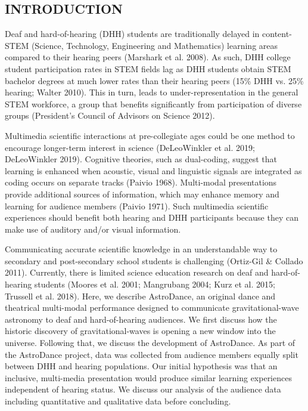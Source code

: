 \documentclass[11.5pt]{sig-alternate} %
\begin{document}
\begin{large}
  
\section*{INTRODUCTION}

Deaf and hard-of-hearing (DHH) students are traditionally delayed in content-STEM (Science, Technology, Engineering and Mathematics) learning areas compared to their hearing peers (Marshark et al. 2008).  As such, DHH college student participation rates in STEM fields lag as DHH students obtain STEM bachelor degrees at much lower rates than their hearing peers (15\% DHH vs. 25\% hearing; Walter 2010).  This in turn, leads to under-representation in the general STEM workforce, a group that benefits significantly from participation of diverse groups (President’s Council of Advisors on Science 2012).

Multimedia scientific interactions at pre-colle\-giate ages could be one method to encourage longer-term interest in science (DeLeoWinkler et al. 2019; DeLeoWinkler 2019).  Cognitive theories, such as dual-coding, suggest that learning is enhanced when acoustic, visual and linguistic signals are integrated as coding occurs on separate tracks (Paivio 1968).  Multi-modal presentations provide additional sources of information, which may enhance memory and learning for audience members (Paivio 1971).  Such multimedia scientific experiences should benefit both hearing and DHH participants because they can make use of auditory and/or visual information.

Communicating accurate scientific knowledge in an understandable way to secondary and post-secondary school students is challenging (Ortiz-Gil \& Collado 2011).  Currently, there is limited science education research on deaf and hard-of-hearing students (Moores et al. 2001; Mangrubang 2004; Kurz et al. 2015; Trussell et al. 2018).  Here, we describe AstroDance, an original dance and theatrical multi-modal performance designed to communicate gravitational-wave astronomy to deaf and hard-of-hearing audiences.  We first discuss how the historic discovery of gravitational-waves is opening a new window into the universe.  Following that, we discuss the development of AstroDance.  As part of the AstroDance project, data was collected from  audience members equally split between DHH and hearing populations. Our initial hypothesis was that an inclusive, multi-media presentation would produce similar learning experiences independent of hearing status.  We discuss our analysis of the audience data including quantitative and qualitative data before concluding.


\end{large}
\end{document}
